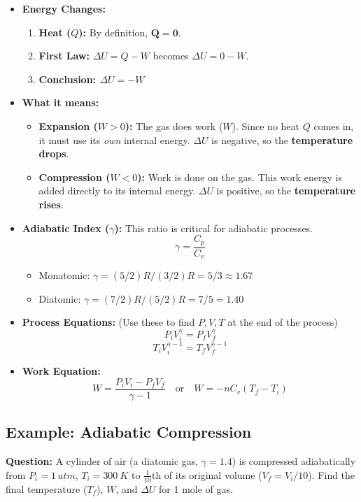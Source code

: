 \documentclass[article]{article}
\begin{document}
\begin{itemize}
    \item \textbf{Energy Changes:}
    \begin{enumerate}
        \item \textbf{Heat ($Q$):} By definition, $\mathbf{Q = 0}$.
        \item \textbf{First Law:} $\Delta U = Q - W$ becomes $\Delta U = 0 - W$.
        \item \textbf{Conclusion: $\Delta U = -W$}
    \end{enumerate}
    \item \textbf{What it means:}
    \begin{itemize}
        \item \textbf{Expansion ($W > 0$):} The gas does work ($W$). Since no heat $Q$ comes in, it must use its \textit{own} internal energy. $\Delta U$ is negative, so the \textbf{temperature drops}.
        \item \textbf{Compression ($W < 0$):} Work is done on the gas. This work energy is added directly to its internal energy. $\Delta U$ is positive, so the \textbf{temperature rises}.
    \end{itemize}
    \item \textbf{Adiabatic Index ($\gamma$):} This ratio is critical for adiabatic processes.
        $$ \gamma = \frac{C_p}{C_v} $$
    \begin{itemize}
        \item Monatomic: $\gamma = (5/2)R / (3/2)R = 5/3 \approx 1.67$
        \item Diatomic: $\gamma = (7/2)R / (5/2)R = 7/5 = 1.40$
    \end{itemize}
    \item \textbf{Process Equations:} (Use these to find $P, V, T$ at the end of the process)
        $$ P_iV_i^\gamma = P_fV_f^\gamma $$
        $$ T_iV_i^{\gamma-1} = T_fV_f^{\gamma-1} $$
    \item \textbf{Work Equation:}
        $$ W = \frac{P_iV_i - P_fV_f}{\gamma - 1} \quad \text{or} \quad W = -nC_v(T_f - T_i) $$
\end{itemize}

\subsection{Example: Adiabatic Compression}
\textbf{Question:} A cylinder of air (a diatomic gas, $\gamma = 1.4$) is compressed adiabatically from $P_i = \SI{1}{atm}$, $T_i = \SI{300}{K}$ to $\frac{1}{10}$th of its original volume ($V_f = V_i / 10$). Find the final temperature ($T_f$), $W$, and $\Delta U$ for 1 mole of gas.
\end{document}
